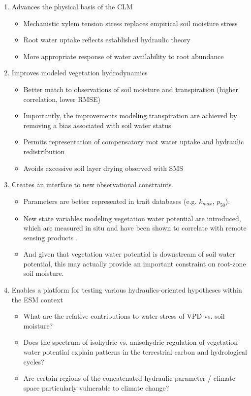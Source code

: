 \documentclass[draft,linenumbers]{agujournal}
\begin{document}
\begin{enumerate}
    \item Advances the physical basis of the CLM
        \begin{itemize}
        \item Mechanistic xylem tension stress replaces empirical soil moisture stress
        \item Root water uptake reflects established hydraulic theory
        \item More appropriate response of water availability to root abundance 
        \end{itemize}
    \item Improves modeled vegetation hydrodynamics
    	\begin{itemize}
	\item Better match to observations of soil moisture and transpiration (higher correlation, lower RMSE)
	\item Importantly, the improvements modeling transpiration are achieved by removing a bias associated with soil water status
	\item Permits representation of compensatory root water uptake and hydraulic redistribution
	\item Avoids excessive soil layer drying observed with SMS
	\end{itemize}
    \item Creates an interface to new observational constraints
        \begin{itemize}
        \item Parameters are better represented in trait databases (e.g. $k_{max}$, $p_{50}$).
        \item New state variables modeling vegetation water potential are introduced, which are measured in situ and have been shown to correlate with remote sensing products \citep{momen2017}.
        \item And given that vegetation water potential is downstream of soil water potential, this may actually provide an important constraint on root-zone soil moisture.
        \end{itemize}
    \item Enables a platform for testing various hydraulics-oriented hypotheses within the ESM context
    \begin{itemize}
        \item What are the relative contributions to water stress of VPD vs. soil moisture?
        \item Does the spectrum of isohydric vs. anisohydric regulation of vegetation water potential explain patterns in the terrestrial carbon and hydrological cycles?
        \item Are certain regions of the concatenated hydraulic-parameter / climate space particularly vulnerable to climate change?
    \end{itemize}
\end{enumerate}
\end{document}
